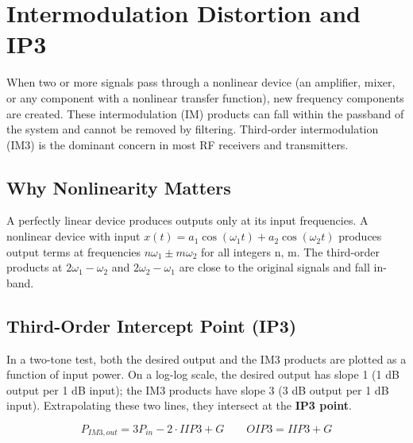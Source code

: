 \section{Intermodulation Distortion and IP3}\label{sec:wiki_intermodulation}



When two or more signals pass through a nonlinear device (an amplifier, mixer, or any component with a nonlinear transfer function), new frequency components are created. These intermodulation (IM) products can fall within the passband of the system and cannot be removed by filtering. Third-order intermodulation (IM3) is the dominant concern in most RF receivers and transmitters.

      

\subsection{Why Nonlinearity Matters}

      

A perfectly linear device produces outputs only at its input frequencies. A nonlinear device with input $x(t) = a_1\cos(\omega_1 t) + a_2\cos(\omega_2 t)$ produces output terms at frequencies $n\omega_1 \pm m\omega_2$ for all integers n, m. The third-order products at $2\omega_1 - \omega_2$ and $2\omega_2 - \omega_1$ are close to the original signals and fall in-band.

      

\subsection{Third-Order Intercept Point (IP3)}

      

In a two-tone test, both the desired output and the IM3 products are plotted as a function of input power. On a log-log scale, the desired output has slope 1 (1 dB output per 1 dB input); the IM3 products have slope 3 (3 dB output per 1 dB input). Extrapolating these two lines, they intersect at the \textbf{IP3 point}.


      
\[P_{IM3,out} = 3P_{in} - 2\cdot IIP3 + G \qquad OIP3 = IIP3 + G\]

      

